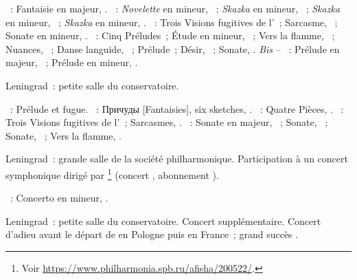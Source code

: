 \begin{description}
 \textsc{\Schumann{}}~: Fantaisie en \kC majeur, .
 \textsc{\Medtner{}}~: \emph{Novelette} en \kC mineur, 
 ~; \emph{Skazka} en \kE mineur,  ~;
 \emph{Skazka} en \kF mineur,  ~; \emph{Skazka} en \kB
 mineur,  .
 \textsc{\Prokofiev{}}~: Trois Visions fugitives de l'~; Sarcasme,
  ~; Sonate en \kA mineur, .
 \textsc{\Scriabine{}}~: Cinq Préludes~; Étude en \kD \Sharp mineur,
  ~; Vers la flamme, ~; Nuances, 
 ~; Danse languide,  ~; Prélude~; Désir,
  ~; Sonate, .
 \emph{Bis} -- \textsc{\Rachmaninov{}}~: Prélude en \kG majeur, 
 ~; Prélude en \kG \Sharp mineur,  .
 \item[\DateWithWeekDay{1928-02-26}]
 Leningrad~: petite salle du conservatoire.

 \textsc{\Glazounov{}}~: Prélude et fugue.
 \textsc{\Miaskovski{}}~: \foreignlanguage{russian}{Причуды} [Fantaisies],
 six sketches, .
 \textsc{\Liadov{}}~: Quatre Pièces, .
 \textsc{\Prokofiev{}}~: Trois Visions fugitives de l'~; Sarcasmes,
 .
 \textsc{\Scriabine{}}~: Sonate en \kF \Sharp majeur, ~; Sonate,
 ~; Sonate, ~; Vers la flamme, .
 \item[\DateWithWeekDay{1928-03-04}]
 Leningrad~: grande salle de la société philharmonique.
 Participation à un concert symphonique dirigé par \AGauk{}%
 \footnote{Voir \href{https://www.philharmonia.spb.ru/afisha/200522/}%
 {https://www.philharmonia.spb.ru/afisha/200522/}.}
 (concert , abonnement ).

 \textsc{\Glazounov{}}~: Concerto en \kF mineur, .
 \item[\DateWithWeekDay{1928-03-06}]
 Leningrad~: petite salle du conservatoire.
 Concert supplémentaire.
 Concert d'adieu avant le départ de \VSofronitsky{} en Pologne puis en
 France~; grand succès \citep[voir][p.~148]{Nekrasova08}.


\end{description}
